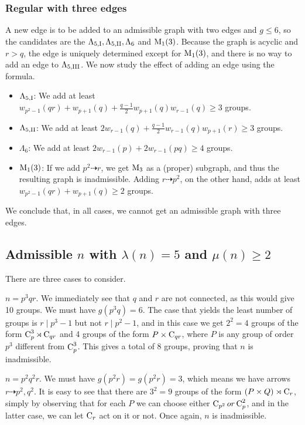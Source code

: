 \subsubsection*{Regular  with three edges}
A new edge is to be added to an admissible graph with two edges and $g \le 6$, so the candidates are the $\Lambda_{5,\text{I}}, \Lambda_{5,\text{II}}, \Lambda_6$ and $\text{M}_{1}(3)$. Because the graph is acyclic and $r > q$, the edge is uniquely determined except for $\text{M}_{1}(3)$, and there is no way to add an edge to $\Lambda_{5,\text{III}}$. We now study the effect of adding an edge using the formula.
\begin{itemize}
	\item $\Lambda_{5,\text{I}}$: We add at least $w_{p^2 - 1}(qr) + w_{p + 1}(q) + \frac{q - 1}{2}w_{p + 1}(q)w_{r - 1}(q) \ge 3$ groups.
	\item $\Lambda_{5,\text{II}}$: We add at least $2w_{r - 1}(q) + \frac{q - 1}{2} w_{r - 1}(q)w_{p + 1}(r) \ge 3$ groups.
	\item $\Lambda_6$: We add at least $2w_{r - 1}(p) + 2w_{r - 1}(pq) \ge 4$ groups.
	\item $\text{M}_{1}(3)$: If we add $p^2 \dashrightarrow r$, we get $\text{M}_{3}$ as a (proper) subgraph, and thus the resulting graph is inadmissible. Adding $r \dashrightarrow p^2$, on the other hand, adds at least $w_{p^2 - 1}(qr) + w_{p + 1}(q) \ge 2$ groups.
\end{itemize}
We conclude that, in all cases, we cannot get an admissible graph with three edges.


\subsection{Admissible $n$ with $\lambda(n) = 5$ and $\mu(n) \ge 2$} 
There are three cases to consider.

 $n = p^3 q r$.
We immediately see that $q$ and $r$ are not connected, as this would give 10 groups. We must have $g(p^3 q) = 6$. The case that yields the least number of groups is $r \mid p^3 - 1$ but not $r \mid p^2 - 1$, and in this case we get $2^2 = 4$ groups of the form $\operatorname{C}_{p}^3 \rtimes \operatorname{C}_{qr}$ and 4 groups of the form $P \times \operatorname{C}_{qr}$, where $P$ is any group of order $p^3$ different from $\operatorname{C}_{p}^3$. This gives a total of 8 groups, proving that $n$ is inadmissible.

 $n = p^2 q^2 r$.
We must have $g(p^2 r) = g(p^2 r) = 3$, which means we have arrows $r \dashrightarrow p^2, q^2$. It is easy to see that there are $3^2 = 9$ groups of the form $(P \times Q) \rtimes \operatorname{C}_{r}$, simply by observing that for each $P$ we can choose either $\operatorname{C}_{p^2} or \operatorname{C}_{p}^2$, and in the latter case, we can let $\operatorname{C}_{r}$ act on it or not. Once again, $n$ is inadmissible.
 

